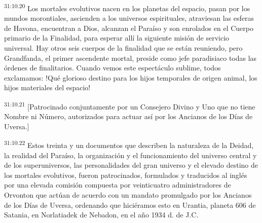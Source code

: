 \par
\textsuperscript{31:10.20} Los mortales evolutivos nacen en los planetas del espacio, pasan por los mundos morontiales, ascienden a los universos espirituales, atraviesan las esferas de Havona, encuentran a Dios, alcanzan el Paraíso y son enrolados en el Cuerpo primario de la Finalidad, para esperar allí la siguiente misión de servicio universal. Hay otros seis cuerpos de la finalidad que se están reuniendo, pero Grandfanda, el primer ascendente mortal, preside como jefe paradisiaco todas las órdenes de finalitarios. Cuando vemos este espectáculo sublime, todos exclamamos: !Qué glorioso destino para los hijos temporales de origen animal, los hijos materiales del espacio!

\par
\textsuperscript{31:10.21} [Patrocinado conjuntamente por un Consejero Divino y Uno que no tiene Nombre ni Número, autorizados para actuar así por los Ancianos de los Días de Uversa.]

\par
\textsuperscript{31:10.22} Estos treinta y un documentos que describen la naturaleza de la Deidad, la realidad del Paraíso, la organización y el funcionamiento del universo central y de los superuniversos, las personalidades del gran universo y el elevado destino de los mortales evolutivos, fueron patrocinados, formulados y traducidos al inglés por una elevada comisión compuesta por veinticuatro administradores de Orvonton que actúan de acuerdo con un mandato promulgado por los Ancianos de los Días de Uversa, ordenando que hiciéramos esto en Urantia, planeta 606 de Satania, en Norlatiadek de Nebadon, en el año 1934 d. de J.C.